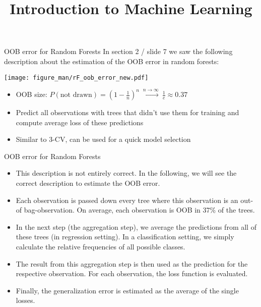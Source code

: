 \documentclass[11pt,compress,t,notes=noshow, xcolor=table]{beamer}
\title{Introduction to Machine Learning}
\institute{\href{https://compstat-lmu.github.io/lecture_i2ml/}{compstat-lmu.github.io/lecture\_i2ml}}
\date{}
\begin{document}
\sloppy



\begin{vbframe}{OOB error for Random Forests}
In section 2 / slide 7 we saw the following description about the estimation of the OOB error in random forests:
\begin{center}
\texttt{[image: figure\_man/rF\_oob\_error\_new.pdf]}
\end{center}

\begin{itemize}
  \item OOB size: $P(\text{not drawn}) = \left(1 - \frac{1}{n}\right)^n \ \stackrel{n \to \infty}{\longrightarrow} \ \frac{1}{e} \approx 0.37$
  \item Predict all observations with trees that didn't use them for training and compute average loss of these predictions
  \item Similar to 3-CV, can be used for a quick model selection
\end{itemize}


\end{vbframe}


\begin{vbframe}{OOB error for Random Forests}
\begin{itemize}
\item This description is not entirely correct. In the following, we will see the correct description to estimate the OOB error. 
\item Each observation is passed down every  tree where this observation is an out-of bag-observation. On average, each observation is OOB in 37\% of the trees. 
\item In the next step (the aggregation step), we average the predictions from all of these trees (in regression setting). In a classification setting, we simply calculate the relative frequencies of all possible classes. 
\item The result from this aggregation step is then used as the prediction for the respective observation. For each observation, the loss function is evaluated. 
\item Finally, the generalization error is estimated as the average of the single losses.  
\end{itemize}
\end{vbframe}
\end{document}
